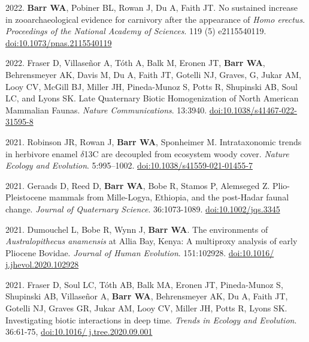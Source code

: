 \begin{etaremune}
\item 2022. {\bfseries Barr WA}, Pobiner BL, Rowan J, Du A, Faith JT.  No sustained increase in zooarchaeological evidence for carnivory after the appearance of \emph{Homo erectus}. \emph{Proceedings of the National Academy of Sciences}. 119 (5) e2115540119. \href{https://doi.org/10.1073/pnas.2115540119}{doi:10.1073/pnas.2115540119}

\item 2022. Fraser D, Villaseñor A, Tóth A, Balk M, Eronen JT, {\bfseries Barr WA}, Behrensmeyer AK, Davis M, Du A, Faith JT, Gotelli NJ, Graves, G, Jukar AM, Looy CV, McGill BJ, Miller JH, Pineda-Munoz S, Potts R,  Shupinski AB, Soul LC, and Lyons SK. Late Quaternary Biotic Homogenization of North American Mammalian Faunas. \emph{Nature Communications}. 13:3940. \href{https://doi.org/10.1038/s41467-022-31595-8}{doi:10.1038/s41467-022-31595-8}



\item 2021. Robinson JR, Rowan J,  {\bfseries Barr WA}, Sponheimer M. Intrataxonomic trends in herbivore enamel $\delta$13C are decoupled from ecosystem woody cover.  \emph{Nature Ecology and Evolution}. 5:995–1002. \href{https://dx.doi.org/10.1038/s41559-021-01455-7}{doi:10.1038/s41559-021-01455-7}

\item 2021. Geraads D, Reed D, {\bfseries Barr WA}, Bobe R, Stamos P, Alemseged Z. Plio-Pleistocene mammals from Mille-Logya, Ethiopia, and the post-Hadar faunal change. \emph{Journal of Quaternary Science}. 36:1073-1089. \href{https://doi.org/10.1002/jqs.3345}{doi:10.1002/jqs.3345}

\item 2021. Dumouchel L, Bobe R, Wynn J, {\bfseries Barr WA}. The environments of \emph{Australopithecus anamensis} at Allia Bay, Kenya: A multiproxy analysis of early Pliocene Bovidae. \emph{Journal of Human Evolution}. 151:102928. \href{https://doi.org/10.1016/j.jhevol.2020.102928}{doi:10.1016/ j.jhevol.2020.102928}

\item 2021. Fraser D, Soul LC, Tóth AB, Balk MA, Eronen JT, Pineda-Munoz S, Shupinski AB, Villaseñor A, {\bfseries Barr WA}, Behrensmeyer AK, Du A, Faith JT, Gotelli NJ, Graves GR, Jukar AM, Looy CV, Miller JH, Potts R, Lyons SK. Investigating biotic interactions in deep time. \emph{Trends in Ecology and Evolution}. 36:61-75, \href{https://doi.org/10.1016/j.tree.2020.09.001}{doi:10.1016/ j.tree.2020.09.001} 


\end{etaremune}
